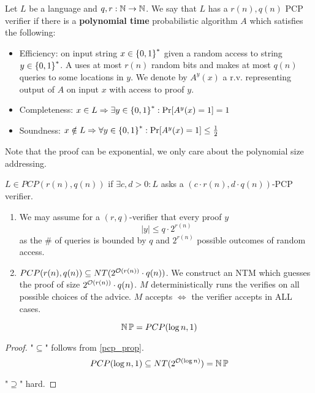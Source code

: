 \begin{definition}
	Let $L$ be a language and $q, r:\operatorname{\mathbb{N}} \to \operatorname{\mathbb{N}}$.
	We say that $L$  has a $r(n), q(n)$ PCP verifier if there is a \textbf{polynomial time} probabilistic algorithm $A$ which satisfies the following:
	\begin{itemize}
		\item Efficiency: on input string $x \in \operatorname{\{ 0, 1 \}}^{\ast}$ given a random access to string $y \in \operatorname{\{ 0, 1 \}}^{\ast}$. A uses at most $r(n)$ random bits and makes at most $q(n)$ queries to some locations in $y$.
		We denote by $A^y(x)$ a r.v. representing output of $A$ on input $x$ with access to proof $y$.
	\item Completeness: $x \in L \Rightarrow \exists y \in \operatorname{\{ 0, 1 \}}^{\ast}: \operatorname{Pr}[A^y(x) = 1] = 1$
	\item Soundness: $x \notin L \Rightarrow \forall y \in \operatorname{\{ 0, 1 \}}^{\ast}: \operatorname{Pr}[A^y(x) = 1] \leq \frac{1}{2}$
	\end{itemize}

	Note that the proof can be exponential, we only care about the polynomial size addressing.
\end{definition}

\begin{definition}
	$L \in PCP(r(n), q(n))$ if $\exists c, d > 0: L$ asks a $(c \cdot r(n), d \cdot q(n))$-PCP verifier.
\end{definition}

\begin{lemma}\label{pcp_prop}
	\begin{enumerate}
		\item We may assume for a $(r, q)$-verifier that every proof $y$
			\[ |y| \leq q \cdot 2^{r(n)} \]
			as the \# of queries is bounded by $q$ and $2^{r(n)}$ possible outcomes of random access.
		\item $PCP(r(n), q(n)) \subseteq NT(2^{\mathcal{O}(r(n))} \cdot q(n))$.
			We construct an NTM which guesses the proof of size $2^{\mathcal{O}(r(n))} \cdot q(n)$.
			$M$ deterministically runs the verifies on all possible choices of the advice.
			$M$ accepts $\iff$ the verifier accepts in ALL cases.
	\end{enumerate}
\end{lemma}

\begin{theorem}[PCP]\label{pcp}
	\[ \operatorname{\operatorname{\mathbb{N}}\mathbb{P}} = PCP (\log n, 1) \]
\end{theorem}
\begin{proof}
	"$\subseteq$" follows from \cref{pcp_prop}.
	\[ PCP (\log n, 1) \subseteq NT(2^{\mathcal{O}(\log n)}) = \operatorname{\operatorname{\mathbb{N}}\mathbb{P}} \]

	"$\supseteq$" hard.
\end{proof}

